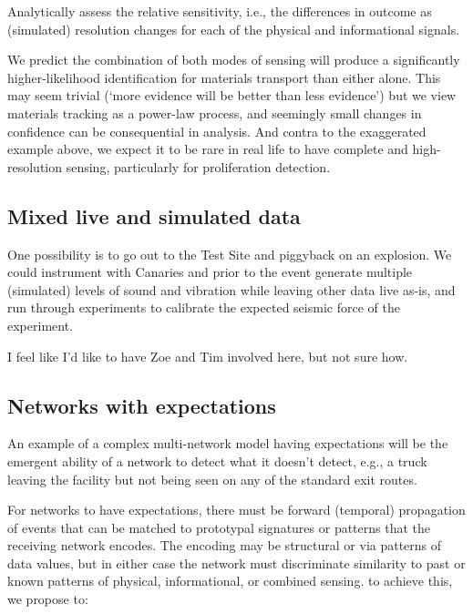 \documentclass{article} %
\begin{document}


Analytically assess the relative sensitivity, i.e., the differences in outcome as (simulated) resolution changes for each of the physical and informational signals. 

We predict the combination of both modes of sensing will produce a significantly higher-likelihood identification for materials transport than either alone. This may seem trivial (`more evidence will be better than less evidence') but we view materials tracking as a power-law process, and seemingly small changes in confidence can be consequential in analysis. And contra to the exaggerated example above, we expect it to be rare in real life to have complete and high-resolution sensing, particularly for proliferation detection.

\subsection{Mixed live and simulated data}
One possibility is to go out to the Test Site and piggyback on an explosion. We could instrument with Canaries and prior to the event generate multiple (simulated) levels of sound and vibration while leaving other data live as-is, and run through experiments to calibrate the expected seismic force of the experiment. 

I feel like I'd like to have Zoe and Tim involved here, but not sure how.

\subsection{Networks with expectations}
An example of a complex multi-network model having expectations will be the emergent ability of a network to detect what it doesn't detect, e.g., a truck leaving the facility but not being seen on any of the standard exit routes. 

For networks to have expectations, there must be forward (temporal) propagation of events that can be matched to prototypal signatures or patterns that the receiving network encodes. The encoding may be structural or via patterns of data values, but in either case the network must discriminate similarity to past or known patterns of physical, informational, or combined sensing. to achieve this, we propose to:
\end{document}
